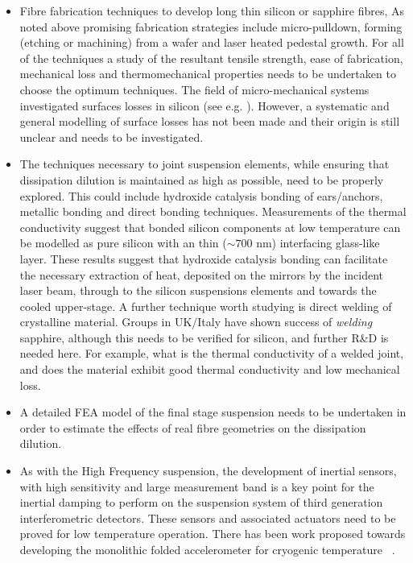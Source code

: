 \begin{itemize}

\item Fibre fabrication techniques to develop long thin silicon or sapphire fibres, As noted above promising fabrication strategies include micro-pulldown, forming (etching or machining) from a wafer and laser heated pedestal growth. For all of the techniques a study of the resultant tensile strength, ease of fabrication, mechanical loss and thermomechanical properties needs to be undertaken to choose the optimum techniques. The field of micro-mechanical systems investigated surfaces losses in silicon (see e.g. \cite{Yang2000,Yasumura2000,Yang2002}). However, a systematic and general modelling of surface losses has not been made and their origin is still unclear and needs to be investigated.

\item The techniques necessary to joint suspension elements, while ensuring that dissipation dilution is maintained as high as possible, need to be properly explored. This could include hydroxide catalysis bonding of ears/anchors, metallic bonding and direct bonding techniques. Measurements of the thermal conductivity suggest that bonded silicon components at low temperature can be modelled as pure silicon with an thin ($\sim 700$ nm) interfacing glass-like layer. These results suggest that hydroxide catalysis bonding can facilitate the necessary extraction of heat, deposited on the mirrors by the incident laser beam, through to the silicon suspensions elements and towards the cooled upper-stage. A further technique worth studying is direct welding of crystalline material. Groups in UK/Italy have shown success of \emph{welding} sapphire, although this needs to be verified for silicon, and further R\&D is needed here. For example, what is the thermal conductivity of a welded joint, and does the material exhibit good thermal conductivity and low mechanical loss. 

\item A detailed FEA model of the final stage suspension needs to be undertaken in order to estimate the effects of real fibre geometries on the dissipation dilution.

\item As with the High Frequency suspension, the development of inertial sensors, with high sensitivity and large measurement band is a key point for the inertial damping to perform on the suspension system of third generation interferometric detectors. These sensors and associated actuators need to be proved for low temperature operation. There has been work proposed towards developing the monolithic folded accelerometer for cryogenic temperature \cite{Bertolini:2006}~\cite{Joris:2018}.


\end{itemize}
